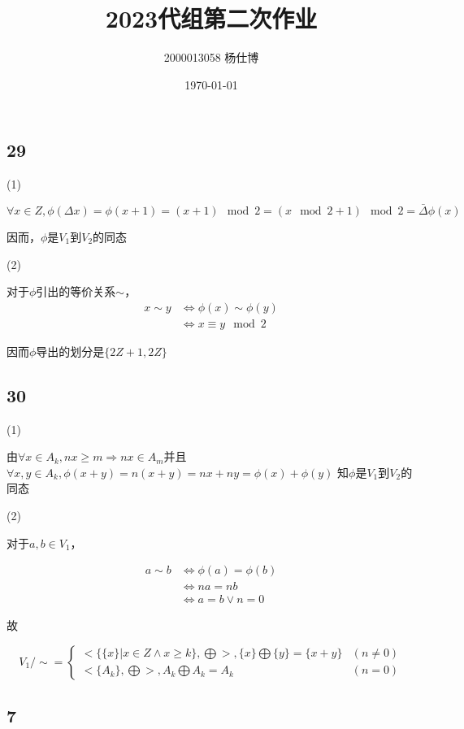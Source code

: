 \documentclass[UTF8]{ctexart}
\title{\vspace{-4cm}2023代组第二次作业}
\author{2000013058 杨仕博}
\date{\today}
\begin{document}
\maketitle

\subsection*{29}

(1)

$\forall x\in Z, \phi(\Delta x) = \phi(x + 1) = (x + 1)\mod 2 = (x\mod 2 + 1)\mod 2 = \bar{\Delta} \phi(x)$

因而，$\phi$是$V_1$到$V_2$的同态

(2)

对于$\phi$引出的等价关系$\sim $，
\[
\begin{aligned}
    x\sim y &\Leftrightarrow \phi(x)\sim \phi(y)\\
        &\Leftrightarrow x\equiv y\mod 2
\end{aligned}    
\]

因而$\phi$导出的划分是$\{2Z+1, 2Z\}$

\subsection*{30}

(1)

由$\forall x\in A_k, nx\geq m\Rightarrow nx\in A_m$并且
$\forall x, y\in A_k, \phi(x + y) = n(x + y) = nx + ny = \phi(x) + \phi(y)$
知$\phi$是$V_1$到$V_2$的同态

(2)

对于$a, b\in V_1$，

\[
\begin{aligned}
    a\sim b &\Leftrightarrow \phi(a) = \phi(b)\\
        &\Leftrightarrow na = nb\\
        &\Leftrightarrow a = b\lor n = 0
\end{aligned}    
\]

故

\[
V_1 / \sim  = 
\begin{cases}
    <\{\{x\} | x\in Z \land x\geq k\}, \bigoplus >, 
    \{x\} \bigoplus\{y\} = \{x + y\} &(n\neq 0)\\
    <\{A_k\}, \bigoplus>, A_k \bigoplus A_k = A_k &(n=0)
\end{cases}
\]

\subsection*{7}
\end{document}
